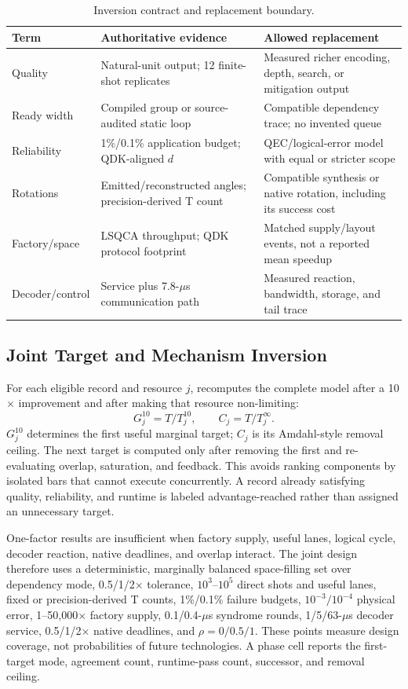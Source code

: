 \begin{table}[t]
\caption{Inversion contract and replacement boundary.}
\centering
\footnotesize
\setlength{\tabcolsep}{3.0pt}
\renewcommand{\arraystretch}{1.08}
\begin{tabular}{p{}p{}p{}}
\toprule
\textbf{Term} & \textbf{Authoritative evidence} & \textbf{Allowed replacement} \\
\midrule
Quality & Natural-unit output; 12 finite-shot replicates & Measured richer encoding, depth, search, or mitigation output \\
Ready width & Compiled group or source-audited static loop & Compatible dependency trace; no invented queue \\
Reliability & 1\%/0.1\% application budget; QDK-aligned $d$ & QEC/logical-error model with equal or stricter scope \\
Rotations & Emitted/reconstructed angles; precision-derived T count & Compatible synthesis or native rotation, including its success cost \\
Factory/space & LSQCA throughput; QDK protocol footprint & Matched supply/layout events, not a reported mean speedup \\
Decoder/control & Service plus 7.8-$\mu$s communication path & Measured reaction, bandwidth, storage, and tail trace \\
\bottomrule
\end{tabular}
\label{tab:inversion-contract}
\end{table}

\subsection{Joint Target and Mechanism Inversion}

For each eligible record and resource $j$, \SystemName recomputes the complete model after a 10$\times$ improvement and after making that resource non-limiting:
\[
G_j^{10}=T/T_j^{10},\qquad C_j=T/T_j^{\infty}.
\]
$G_j^{10}$ determines the first useful marginal target; $C_j$ is its Amdahl-style removal ceiling. The next target is computed only after removing the first and re-evaluating overlap, saturation, and feedback. This avoids ranking components by isolated bars that cannot execute concurrently. A record already satisfying quality, reliability, and runtime is labeled advantage-reached rather than assigned an unnecessary target.

One-factor results are insufficient when factory supply, useful lanes, logical cycle, decoder reaction, native deadlines, and overlap interact. The joint design therefore uses a deterministic, marginally balanced space-filling set over dependency mode, 0.5/1/2$\times$ tolerance, $10^3$--$10^5$ direct shots and useful lanes, fixed or precision-derived T counts, 1\%/0.1\% failure budgets, $10^{-3}/10^{-4}$ physical error, 1--50,000$\times$ factory supply, 0.1/0.4-$\mu$s syndrome rounds, 1/5/63-$\mu$s decoder service, 0.5/1/2$\times$ native deadlines, and $\rho=0/0.5/1$. These points measure design coverage, not probabilities of future technologies. A phase cell reports the first-target mode, agreement count, runtime-pass count, successor, and removal ceiling.

